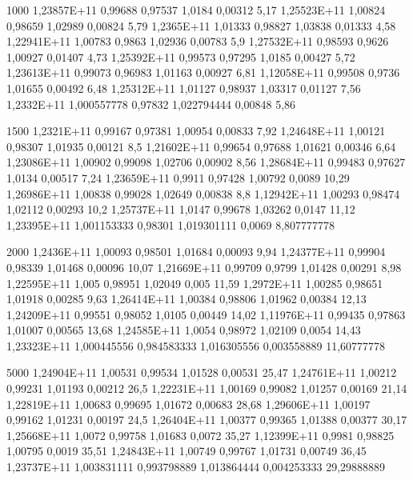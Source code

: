 1000	1,23857E+11	0,99688	0,97537	1,0184	0,00312	5,17																				
	1,25523E+11	1,00824	0,98659	1,02989	0,00824	5,79																				
	1,2365E+11	1,01333	0,98827	1,03838	0,01333	4,58																				
	1,22941E+11	1,00783	0,9863	1,02936	0,00783	5,9																				
	1,27532E+11	0,98593	0,9626	1,00927	0,01407	4,73																				
	1,25392E+11	0,99573	0,97295	1,0185	0,00427	5,72																				
	1,23613E+11	0,99073	0,96983	1,01163	0,00927	6,81																				
	1,12058E+11	0,99508	0,9736	1,01655	0,00492	6,48																				
	1,25312E+11	1,01127	0,98937	1,03317	0,01127	7,56																				
	1,2332E+11	1,000557778	0,97832	1,022794444	0,00848	5,86																				
																										
1500	1,2321E+11	0,99167	0,97381	1,00954	0,00833	7,92																				
	1,24648E+11	1,00121	0,98307	1,01935	0,00121	8,5																				
	1,21602E+11	0,99654	0,97688	1,01621	0,00346	6,64																				
	1,23086E+11	1,00902	0,99098	1,02706	0,00902	8,56																				
	1,28684E+11	0,99483	0,97627	1,0134	0,00517	7,24																				
	1,23659E+11	0,9911	0,97428	1,00792	0,0089	10,29																				
	1,26986E+11	1,00838	0,99028	1,02649	0,00838	8,8																				
	1,12942E+11	1,00293	0,98474	1,02112	0,00293	10,2																				
	1,25737E+11	1,0147	0,99678	1,03262	0,0147	11,12																				
	1,23395E+11	1,001153333	0,98301	1,019301111	0,0069	8,807777778																				
																										
2000	1,2436E+11	1,00093	0,98501	1,01684	0,00093	9,94																				
	1,24377E+11	0,99904	0,98339	1,01468	0,00096	10,07																				
	1,21669E+11	0,99709	0,9799	1,01428	0,00291	8,98																				
	1,22595E+11	1,005	0,98951	1,02049	0,005	11,59																				
	1,2972E+11	1,00285	0,98651	1,01918	0,00285	9,63																				
	1,26414E+11	1,00384	0,98806	1,01962	0,00384	12,13																				
	1,24209E+11	0,99551	0,98052	1,0105	0,00449	14,02																				
	1,11976E+11	0,99435	0,97863	1,01007	0,00565	13,68																				
	1,24585E+11	1,0054	0,98972	1,02109	0,0054	14,43																				
	1,23323E+11	1,000445556	0,984583333	1,016305556	0,003558889	11,60777778																				
																										
5000	1,24904E+11	1,00531	0,99534	1,01528	0,00531	25,47																				
	1,24761E+11	1,00212	0,99231	1,01193	0,00212	26,5																				
	1,22231E+11	1,00169	0,99082	1,01257	0,00169	21,14																				
	1,22819E+11	1,00683	0,99695	1,01672	0,00683	28,68																				
	1,29606E+11	1,00197	0,99162	1,01231	0,00197	24,5																				
	1,26404E+11	1,00377	0,99365	1,01388	0,00377	30,17																				
	1,25668E+11	1,0072	0,99758	1,01683	0,0072	35,27																				
	1,12399E+11	0,9981	0,98825	1,00795	0,0019	35,51																				
	1,24843E+11	1,00749	0,99767	1,01731	0,00749	36,45																				
	1,23737E+11	1,003831111	0,993798889	1,013864444	0,004253333	29,29888889																				
																										
